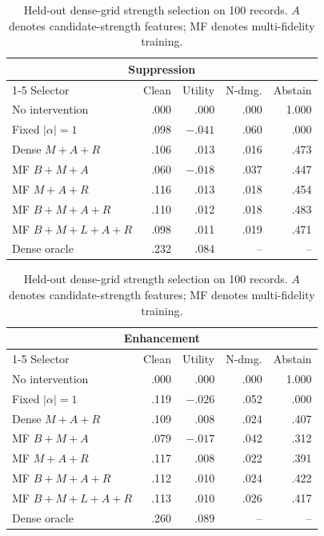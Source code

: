 \begin{table}[t]
\centering
\small
\setlength{\tabcolsep}{3pt}
\caption{Held-out dense-grid strength selection on 100 records.
$A$ denotes candidate-strength features; MF denotes multi-fidelity training.}
\label{tab:strength-selector}
\begin{tabular}{@{}lrrrr@{}}
\toprule
\multicolumn{5}{c}{Suppression} \\
\cmidrule(lr){1-5}
Selector & Clean & Utility & N-dmg. & Abstain \\
\midrule
No intervention & .000 & .000 & .000 & 1.000 \\
Fixed $|\alpha|=1$ & .098 & $-.041$ & .060 & .000 \\
Dense $M+A+R$ & .106 & .013 & .016 & .473 \\
MF $B+M+A$ & .060 & $-.018$ & .037 & .447 \\
MF $M+A+R$ & .116 & .013 & .018 & .454 \\
MF $B+M+A+R$ & .110 & .012 & .018 & .483 \\
MF $B+M+L+A+R$ & .098 & .011 & .019 & .471 \\
Dense oracle & .232 & .084 & -- & -- \\
\bottomrule
\end{tabular}

\begin{tabular}{@{}lrrrr@{}}
\toprule
\multicolumn{5}{c}{Enhancement} \\
\cmidrule(lr){1-5}
Selector & Clean & Utility & N-dmg. & Abstain \\
\midrule
No intervention & .000 & .000 & .000 & 1.000 \\
Fixed $|\alpha|=1$ & .119 & $-.026$ & .052 & .000 \\
Dense $M+A+R$ & .109 & .008 & .024 & .407 \\
MF $B+M+A$ & .079 & $-.017$ & .042 & .312 \\
MF $M+A+R$ & .117 & .008 & .022 & .391 \\
MF $B+M+A+R$ & .112 & .010 & .024 & .422 \\
MF $B+M+L+A+R$ & .113 & .010 & .026 & .417 \\
Dense oracle & .260 & .089 & -- & -- \\
\bottomrule
\end{tabular}

\end{table}
